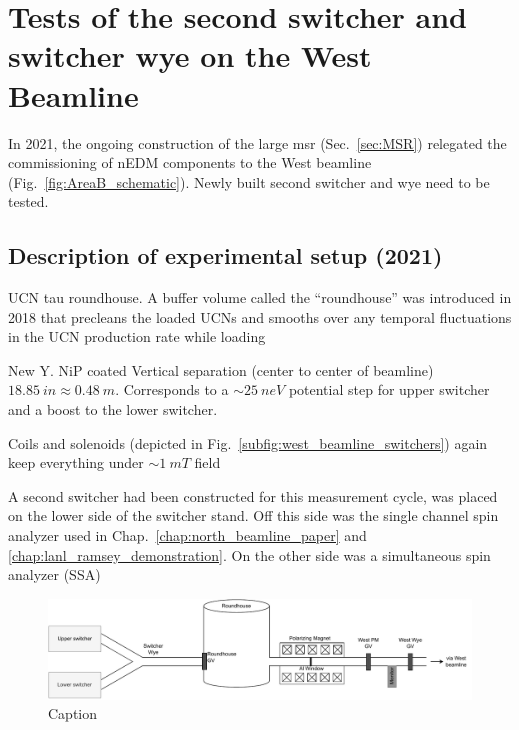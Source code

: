 
\chapter{Tests of the second switcher and switcher wye on the West Beamline}\label{chap:fall2021}


In 2021, the ongoing construction of the large \acrshort{msr} (Sec.~\ref{sec:MSR}) relegated the commissioning of nEDM components to the West beamline (Fig.~\ref{fig:AreaB_schematic}). Newly built second switcher and wye need to be tested.


\section{Description of experimental setup (2021)}


UCN tau roundhouse. A buffer volume called the ``roundhouse'' was introduced in 2018 that precleans the loaded UCNs and smooths over any temporal fluctuations in the UCN production rate while loading

New Y. NiP coated Vertical separation (center to center of beamline) $\qty{18.85}{in}\approx\qty{0.48}{m}$. Corresponds to a $\sim \qty{25}{neV}$ potential step for upper switcher and a boost to the lower switcher. 

Coils and solenoids (depicted in Fig.~\ref{subfig:west_beamline_switchers}) again keep everything under $\sim \qty{1}{mT}$ field

A second switcher had been constructed for this measurement cycle, was placed on the lower side of the switcher stand. Off this side was the single channel spin analyzer used in Chap.~\ref{chap:north_beamline_paper} and \ref{chap:lanl_ramsey_demonstration}. On the other side was a simultaneous spin analyzer (SSA)

\begin{figure}
    \centering
    \includegraphics[width=\textwidth]{figures/westbeamline_2021.pdf}
    \caption{Caption}\label{fig:west_beamline_2021}
\end{figure}

